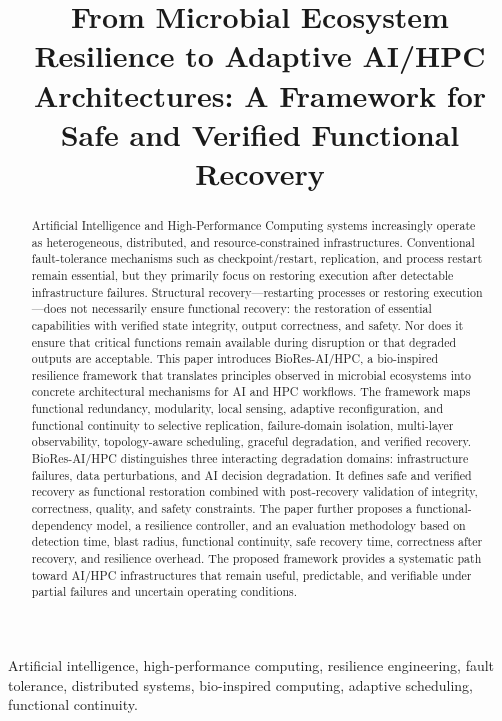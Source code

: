 \documentclass[conference]{IEEEtran}
\title{From Microbial Ecosystem Resilience to Adaptive AI/HPC Architectures: A Framework for Safe and Verified Functional Recovery}
\author{\IEEEauthorblockN{Dr. Patrick Lemoine}
\IEEEauthorblockA{Independent Researcher / HPC and AI Systems Engineer\\
Email: \texttt{[lemoine\_patrick@yahoo.ca]} \quad ORCID: \texttt{[0009-0008-9465-8159]}}}
\begin{document}
\maketitle

\begin{abstract}
Artificial Intelligence and High-Performance Computing systems increasingly operate as heterogeneous, distributed, and resource-constrained infrastructures. Conventional fault-tolerance mechanisms such as checkpoint/restart, replication, and process restart remain essential, but they primarily focus on restoring execution after detectable infrastructure failures. Structural recovery---restarting processes or restoring execution---does not necessarily ensure functional recovery: the restoration of essential capabilities with verified state integrity, output correctness, and safety. Nor does it ensure that critical functions remain available during disruption or that degraded outputs are acceptable. This paper introduces BioRes-AI/HPC, a bio-inspired resilience framework that translates principles observed in microbial ecosystems into concrete architectural mechanisms for AI and HPC workflows. The framework maps functional redundancy, modularity, local sensing, adaptive reconfiguration, and functional continuity to selective replication, failure-domain isolation, multi-layer observability, topology-aware scheduling, graceful degradation, and verified recovery. BioRes-AI/HPC distinguishes three interacting degradation domains: infrastructure failures, data perturbations, and AI decision degradation. It defines safe and verified recovery as functional restoration combined with post-recovery validation of integrity, correctness, quality, and safety constraints. The paper further proposes a functional-dependency model, a resilience controller, and an evaluation methodology based on detection time, blast radius, functional continuity, safe recovery time, correctness after recovery, and resilience overhead. The proposed framework provides a systematic path toward AI/HPC infrastructures that remain useful, predictable, and verifiable under partial failures and uncertain operating conditions.
\end{abstract}

\begin{IEEEkeywords}
Artificial intelligence, high-performance computing, resilience engineering, fault tolerance, distributed systems, bio-inspired computing, adaptive scheduling, functional continuity.
\end{IEEEkeywords}
\end{document}
